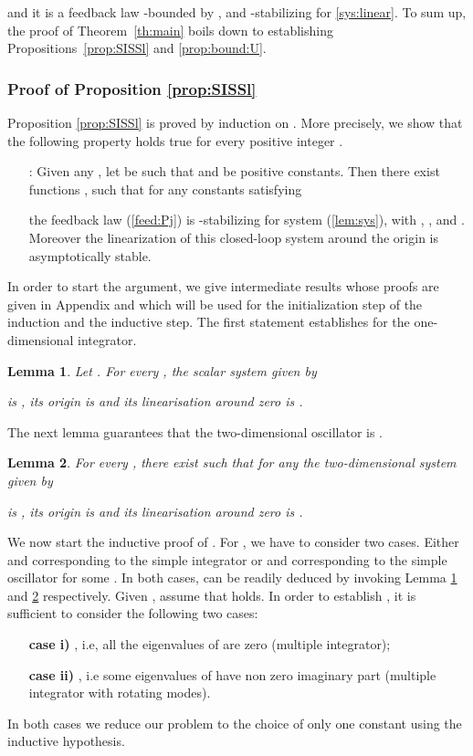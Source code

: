 \documentclass[letterpaper, 10pt]{article}
\newtheorem{lem}{Lemma}
\newcommand{\rref}[1]{(\ref{#1})}
\begin{document}
and it is a feedback law -bounded by , and  -stabilizing for \eqref{sys:linear}. To sum up, the proof of Theorem~\ref{th:main} boils down to establishing Propositions~\ref{prop:SISSl} and \ref{prop:bound:U}.



\subsubsection{Proof of Proposition \ref{prop:SISSl}}\label{sec:proofprop1}
Proposition \ref{prop:SISSl} is proved by induction on . More precisely, we show that the following property holds true for every positive integer .
\begin{itemize}
\item[ : ] Given any , let  be such that  and  be positive constants. Then there exist  functions ,  such that for any constants  satisfying
 
the feedback law \rref{feed:Pj} is -stabilizing for system \rref{lem:sys}, with , , and . Moreover the linearization of this closed-loop system around the origin is asymptotically stable.
\end{itemize}
In order to start the argument, we give intermediate results whose proofs are given in Appendix
and which will be used for the initialization step of the induction and the inductive step. The first statement establishes  for the one-dimensional integrator.
\begin{lem}
\label{lem:SISS:int}
Let . For every , the scalar system given by

is  , its origin is  and its linearisation around zero is . 
 \end{lem}
The next lemma guarantees that the two-dimensional oscillator is .
\begin{lem}
\label{Lem:osci}
For every ,  there exist  such that for any  the two-dimensional system given by
 
is , its origin is  and its linearisation around zero is . 
\end{lem}
We now start the inductive proof of . For , we have to consider two cases. Either  and  corresponding to the simple integrator
 or  and  corresponding to the simple oscillator 
for some .
In both cases,  can be readily deduced by invoking Lemma \ref{lem:SISS:int} and \ref{Lem:osci} respectively. Given , assume that  holds. In order to establish , it is sufficient to consider the following two cases:
\begin{itemize}
\item[{\bf case i)}] , i.e, all the eigenvalues of  are zero (multiple integrator);
\item[{\bf case ii)}]  , i.e some eigenvalues of  have non zero imaginary part (multiple integrator with rotating modes).
\end{itemize} In both cases we reduce our problem to the choice of only one constant  using the inductive hypothesis.
\end{document}
